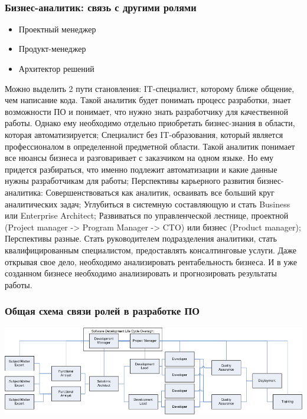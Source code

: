 \documentclass{../industrial-development}
\begin{document}
  ~\cite{Business}

\begin{frame} \frametitle{Бизнес-аналитик: связь с другими ролями}
  \begin{itemize}
  \item Проектный менеджер
  \item Продукт-менеджер
  \item Архитектор решений
  \end{itemize}
\end{frame}

\lecturenotes 
Можно выделить 2 пути становления: 
IT-специалист, которому ближе общение, чем написание кода. Такой аналитик будет понимать процесс разработки, знает возможности ПО и понимает, что нужно знать разработчику для качественной работы. Однако ему необходимо отдельно приобретать бизнес-знания в области, которая автоматизируется;
Специалист без IT-образования, который является профессионалом в определенной предметной области. Такой аналитик понимает все нюансы бизнеса и разговаривает с заказчиком на одном языке. Но ему придется разбираться, что именно подлежит автоматизации и какие данные нужны разработчикам для работы;
Перспективы карьерного развития бизнес-аналитика: 
Совершенствоваться как аналитик, осваивать все больший круг аналитических задач;
Углубиться в системную составляющую и стать Business или Enterprise Architect; 
Развиваться по управленческой лестнице, проектной (Project manager -> Program Manager -> CTO) или бизнес (Product manager); 
Перспективы разные. Стать руководителем подразделения аналитики, стать квалифицированным специалистом, предоставлять консалтинговые услуги. Даже открывая свое дело, необходимо анализировать рентабельность бизнеса. И в уже созданном бизнесе необходимо анализировать и прогнозировать результаты работы.~\cite{Business}

\begin{frame} \frametitle{Общая схема связи ролей в разработке ПО}
 \includegraphics[width=\textwidth]{Fullorgchart1}

\end{frame}
\end{document}
